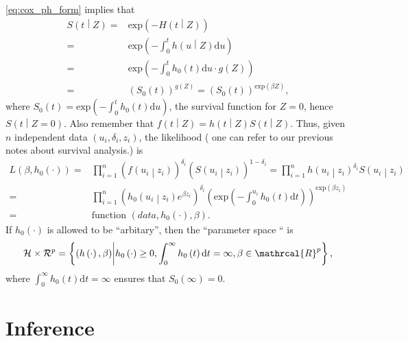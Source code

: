 \documentclass[a4paper,12pt]{article}
\begin{document}
\eqref{eq:cox_ph_form} implies that
\[
  \begin{aligned}
    S\left(t\middle|Z\right)
    =& \mathrm{exp}\left(-H\left(t\middle|Z\right)\right)    \\
    =& \mathrm{exp}\left(-\int_0^th\left(u\middle|Z\right)\mathrm{d}u\right)    \\
    =& \mathrm{exp}\left(-\int_0^th_0\left(t\right)\mathrm{d}u \cdot g\left(Z\right)\right)    \\
    =& \left(S_0\left(t\right)\right)^{g\left(Z\right)}
    = \left(S_0\left(t\right)\right)^{\mathrm{exp}\left(\beta Z\right)}
    ,
  \end{aligned}
\]
where $S_0\left(t\right) = \mathrm{exp}\left( - \int_0^t h_0\left(t\right)\mathrm{d}u\right)$, the survival function for $Z = 0$, hence $S\left(t\middle|Z = 0\right)$. Also remember that $f\left(t\middle|Z\right) = h\left(t\middle|Z\right) S\left(t\middle|Z\right)$. Thus, given $n$ independent data $\left(u_i, \delta_i, z_i\right)$, the likelihood ({\color{blue} one can refer to our previous notes about survival analysis.}) is
\[
  \begin{aligned}
    L\left(\beta, h_0\left(\cdot\right)\right)
    =& \prod\limits_{i = 1}^n
    \left(
      f\left(u_i\middle|z_i\right)
    \right)^{\delta_i}
    \left(
      S\left(u_i\middle|z_i\right)
    \right)^{1 - \delta_i}
    = \prod\limits_{i = 1}^n
    h\left(u_i\middle|z_i\right)^{\delta_i}
    S\left(u_i\middle|z_i\right)    \\
    =& \prod\limits_{i = 1}^n
    \left(
      h_0\left(u_i\middle|z_i\right)
      e^{\beta z_i}
    \right)^{\delta_i}
    \left(
      \mathrm{exp}\left(-\int_0^{u_i}h_0\left(t\right)\mathrm{d}t\right)
    \right)^{\mathrm{exp}\left(\beta z_i\right)}    \\
    =& \text{function $\left(data, h_0\left(\cdot\right), \beta\right)$}.
  \end{aligned}
\]
If $h_0\left(\cdot\right)$ is allowed to be ``arbitary'', then the ``parameter space `` is
\[
  \mathcal{H} \times \mathcal{R}^p
  = \left\{
    \left(h\left(\cdot\right), \beta\right)
    \middle|
    h_0\left(\cdot\right) \geq 0,
    \int_0^\infty h_0\left(t\right)\mathrm{d}t = \infty,
    \beta \in \mathrcal{R}^p
  \right\}
  ,
\]
where $\int_0^\infty h_0\left(t\right)\mathrm{d}t = \infty$ ensures that $S_0\left(\infty\right) = 0$.

\section{Inference}
\label{sec:inference}







\end{document}
